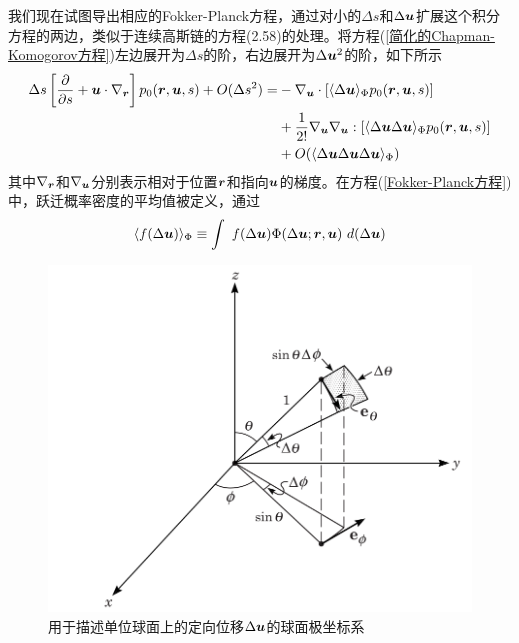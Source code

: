 我们现在试图导出相应的Fokker-Planck方程，通过对小的$\Delta s$和$\Delta \bm{u}$扩展这个积分方程的两边，类似于连续高斯链的方程(2.58)的处理。将方程(\ref{简化的Chapman-Komogorov方程})左边展开为$\Delta s$的阶，右边展开为$\Delta \bm{u}^2$的阶，如下所示\\
\begin{equation}
\begin{aligned}
	\Delta s \left[\frac{\partial}{\partial s}+\bm{u}\cdot\nabla_{\bm{r}}\right]p_0(\bm{r},\bm{u},s)+O(\Delta s^2)=&-\nabla_{\bm{u}} \cdot [\langle \Delta \bm{u}\rangle_\Phi p_0(\bm{r},\bm{u},s)]\\&+\frac{1}{2!}\nabla_{\bm{u}} \nabla_{\bm{u}} :[\langle\Delta \bm{u}\Delta \bm{u} \rangle_\Phi p_0(\bm{r},\bm{u},s)]\\&+O(\langle \Delta \bm{u} \Delta \bm{u}\Delta \bm{u}\rangle_\Phi) \label{Fokker-Planck方程}
\end{aligned}
\end{equation}
其中$\nabla_{\bm{r}}$和$\nabla_{\bm{u}}$分别表示相对于位置$\bm{r}$和指向$\bm{u}$的梯度。在方程(\ref{Fokker-Planck方程})中，跃迁概率密度的平均值被定义，通过
\begin{equation}
\langle f(\Delta \bm{u})\rangle _\Phi\equiv\int \ f(\Delta \bm{u} )\Phi(\Delta \bm{u};\bm{r},\bm{u})\ d(\Delta \bm{u})
\end{equation}
\begin{figure}[H]
	\centering   
	\includegraphics[width=12cm]{./figures/7.png}
	\caption{用于描述单位球面上的定向位移$\Delta \bm{u}$的球面极坐标系}
	\label{用于描述单位球面上的定向位移的球面极坐标系}
\end{figure}

